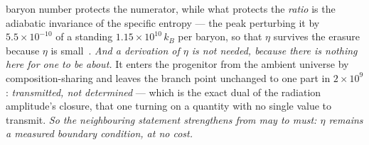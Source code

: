 \documentclass[11pt,a4paper]{article}
\theoremstyle{plain}
\theoremstyle{definition}
\theoremstyle{remark}
\begin{document}
baryon number protects the numerator, while what protects the \emph{ratio} is the adiabatic invariance of
the specific entropy --- the peak perturbing it by $5.5\times10^{-10}$ of a standing $1.15\times10^{10}\,k_B$
per baryon, so that $\eta$ survives the erasure because $\eta$ is
small~\cite{JanzenCosmogenesis}. \emph{And a derivation of $\eta$ is not needed, because there is nothing here
for one to be about.} It enters the progenitor from the ambient universe by composition-sharing and leaves
the branch point unchanged to one part in $2\times10^{9}$: \emph{transmitted, not determined} --- which is the exact dual of the radiation amplitude's closure, that one turning on a quantity with no single value to transmit. \emph{So the neighbouring statement strengthens from may to must: $\eta$ remains a measured
boundary condition, at no cost.}
\end{document}
